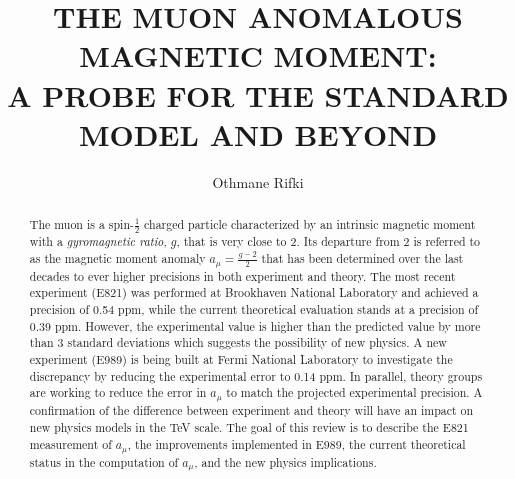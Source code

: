 \documentclass{outhesis}
\begin{document}
\author{Othmane Rifki}
\title{THE MUON ANOMALOUS MAGNETIC MOMENT:\\ A PROBE FOR THE STANDARD MODEL AND BEYOND}
\address{Norman, Oklahoma}


%  


\begin{abstract}
The muon is a spin-$\frac{1}{2}$ charged particle characterized by an intrinsic magnetic moment with a \emph{gyromagnetic ratio}, $g$, that is very close to 2. Its departure from 2 is referred to as the magnetic moment anomaly $\displaystyle a_{\mu} = \frac{g-2}{2}$ that has been determined over the last decades to ever higher precisions in both experiment and theory. The most recent experiment (E821) was performed at Brookhaven National Laboratory and achieved a precision of 0.54 ppm, while the current theoretical evaluation stands at a precision of 0.39 ppm. However, the experimental value is higher than the predicted value by more than 3 standard deviations which suggests the possibility of new physics. A new experiment (E989) is being built at Fermi National Laboratory to investigate the discrepancy by reducing the experimental error to 0.14 ppm. In parallel, theory groups are working to reduce the error in $a_{\mu}$ to match the projected experimental precision. A confirmation of the difference between experiment and theory will have an impact on new physics models in the TeV scale. The goal of this review is to describe the E821 measurement of $a_{\mu}$, the improvements implemented in E989, the current theoretical status in the computation of $a_{\mu}$, and the new physics implications.

\end{abstract}
\end{document}
